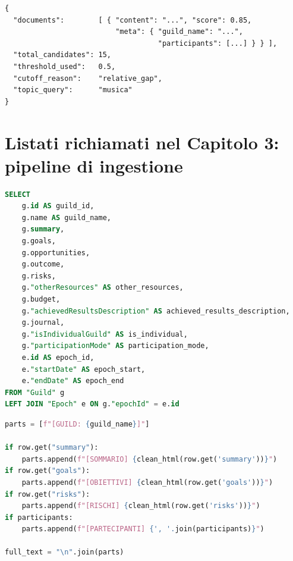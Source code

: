 \begin{lstlisting}[frame=single, breaklines=true, caption={Struttura della response dell'endpoint \texttt{/rag/retrieve}.}, label={lst:api_response}]
{
  "documents":        [ { "content": "...", "score": 0.85,
                          "meta": { "guild_name": "...",
                                    "participants": [...] } } ],
  "total_candidates": 15,
  "threshold_used":   0.5,
  "cutoff_reason":    "relative_gap",
  "topic_query":      "musica"
}
\end{lstlisting}

\section{Listati richiamati nel Capitolo 3: pipeline di ingestione}

\begin{lstlisting}[language=SQL, frame=single, breaklines=true, caption={Campi principali estratti da PostgreSQL per l'ingestione.}, label={lst:postgres_extract_fields}]
SELECT
    g.id AS guild_id,
    g.name AS guild_name,
    g.summary,
    g.goals,
    g.opportunities,
    g.outcome,
    g.risks,
    g."otherResources" AS other_resources,
    g.budget,
    g."achievedResultsDescription" AS achieved_results_description,
    g.journal,
    g."isIndividualGuild" AS is_individual,
    g."participationMode" AS participation_mode,
    e.id AS epoch_id,
    e."startDate" AS epoch_start,
    e."endDate" AS epoch_end
FROM "Guild" g
LEFT JOIN "Epoch" e ON g."epochId" = e.id
\end{lstlisting}

\begin{lstlisting}[language=Python, frame=single, breaklines=true, caption={Schema semplificato della costruzione del documento testuale.}, label={lst:create_document_simplified}]
parts = [f"[GUILD: {guild_name}]"]

if row.get("summary"):
    parts.append(f"[SOMMARIO] {clean_html(row.get('summary'))}")
if row.get("goals"):
    parts.append(f"[OBIETTIVI] {clean_html(row.get('goals'))}")
if row.get("risks"):
    parts.append(f"[RISCHI] {clean_html(row.get('risks'))}")
if participants:
    parts.append(f"[PARTECIPANTI] {', '.join(participants)}")

full_text = "\n".join(parts)
\end{lstlisting}


